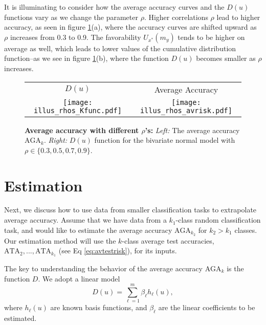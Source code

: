\documentclass[twoside,11pt]{article}
\newenvironment{myfont}{\fontfamily{phv}\selectfont}{\par}
\begin{document}
It is illuminating to consider how the average accuracy curves and the
${D}(u)$ functions vary as we change the parameter $\rho$.  Higher
correlations $\rho$ lead to higher accuracy, as seen in figure
\ref{fig:toy4}(a), where the accuracy curves are shifted upward as
$\rho$ increases from 0.3 to 0.9.  The favorability $U_{x^*}(m_y)$
tends to be higher on average as well, which leads to lower values of
the cumulative distribution function--as we see in figure
\ref{fig:toy4}(b), where the function ${D}(u)$ becomes smaller as
$\rho$ increases.



\begin{figure}[h]
\centering
\begin{tabular}{cc}
\begin{myfont}\hspace{0.2in}$D(u)$\end{myfont} &
\begin{myfont}\hspace{0.4in}Average Accuracy\end{myfont} \\
\texttt{[image: illus\_rhos\_Kfunc.pdf]} &
\texttt{[image: illus\_rhos\_avrisk.pdf]}
\end{tabular}

\caption{\textbf{Average accuracy with different $\rho$'s:}
\emph{Left:} The average accuracy $\text{AGA}_k$. \emph{Right:} ${D}(u)$ function for the bivariate normal model with $\rho \in \{0.3, 0.5, 0.7, 0.9\}$.
}\label{fig:toy4}
\end{figure}

\section{Estimation}\label{sec:extrapolation_estimation}

Next, we discuss how to use data from smaller classification tasks to
extrapolate average accuracy.  Assume that we have data from a
$k_1$-class random classification task, and would like to estimate the
average accuracy $\text{AGA}_{k_2}$ for $k_2>k_1$ classes.  Our
estimation method will use the $k$-class average test accuracies,
$\text{ATA}_2,...,\text{ATA}_{k_1}$ (see Eq \ref{eq:avtestrisk}), for
its inputs.

The key to understanding the behavior of the average accuracy
$\text{AGA}_k$ is the function ${D}$.  We adopt a linear model
\begin{equation}\label{eq:linearKu}
{D}(u) = \sum_{\ell = 1}^m \beta_\ell h_\ell(u),
\end{equation}
where $h_\ell(u)$ are known basis functions, and $\beta_\ell$ are the linear coefficients to be estimated. 
\end{document}
